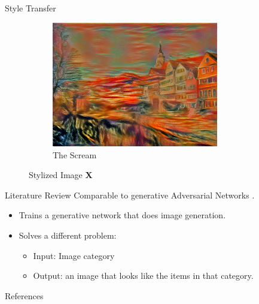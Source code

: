 \documentclass{beamer}
\begin{document}
\begin{frame}{Style Transfer}
\begin{figure}
{\begin{figure}[ht]
    \end{figure}
}{
    \begin{figure}[ht]
    \centering
    \caption*{The Scream}
    \includegraphics[width=0.8\textwidth,height=0.27\textheight]{img/transfer/the-scream}
    \end{figure}
}
\caption*{Stylized Image \textbf{X}}
\end{figure}
\end{frame}

\begin{frame}{Literature Review}
    Comparable to generative Adversarial
    Networks \cite{dosovitskiy2016generating}.
    \begin{itemize}
        \item Trains a generative network
            that does image generation.
        \item Solves a different problem:
            \begin{itemize}
                \item[] Input: Image category
                \item[] Output: an image that looks like
            the items in that category.
            \end{itemize}
    \end{itemize}
\end{frame}

\begin{frame}[allowframebreaks]{References}
    
    
\end{frame}
\end{document}
